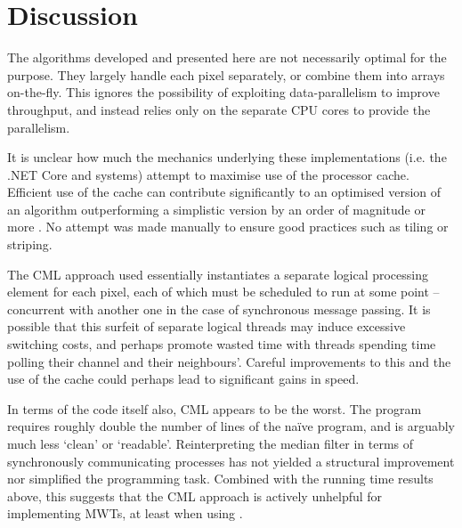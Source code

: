 \section{Discussion}

The algorithms developed and presented here are not necessarily optimal for the purpose.  They largely handle each pixel separately, or combine them into arrays on-the-fly.  This ignores the possibility of exploiting data-parallelism to improve throughput, and instead relies only on the separate CPU cores to provide the parallelism.  %


It is unclear how much the mechanics underlying these implementations (i.e. the .NET Core and \hopac{} systems) attempt to maximise use of the processor cache.  Efficient use of the cache can contribute significantly to an optimised version of an algorithm outperforming a simplistic version by an order of magnitude or more \cite{Ragan-Kelley2017}.  No attempt was made manually to ensure good practices such as tiling or striping.  %

The CML approach used essentially instantiates a separate logical processing element for each pixel, each of which must be scheduled to run at some point -- concurrent with another one in the case of synchronous message passing.  It is possible that this surfeit of separate logical threads may induce excessive switching costs, and perhaps promote wasted time with threads spending time polling their channel and their neighbours'.  Careful improvements to this and the use of the cache could perhaps lead to significant gains in speed.

In terms of the code itself also, CML appears to be the worst.  The program requires roughly double the number of lines of the naïve program, and is arguably much less `clean' or `readable'.  Reinterpreting the median filter in terms of synchronously communicating processes has not yielded a structural improvement nor simplified the programming task.  Combined with the running time results above, this suggests that the CML approach is actively unhelpful for implementing MWTs, at least when using \hopac{}.  %


